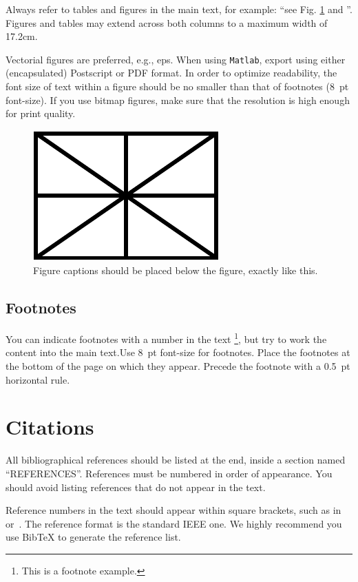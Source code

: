 \documentclass{article}
\begin{document}
Always refer to tables and figures in the main text, for example: ``see Fig. \ref{fig:example} and ''.
Figures and tables may extend across both columns to a maximum width of 17.2cm.

Vectorial figures are preferred, e.g., eps. When using \texttt{Matlab}, export using either (encapsulated) Postscript or PDF format. In order to optimize readability, the font size of text within a figure should be no smaller than
that of footnotes (8~pt font-size). If you use bitmap figures, make sure that the resolution is high enough for print quality. 

\begin{figure}[t]
\centering
\includegraphics[width=0.6\columnwidth]{figure}
\caption{Figure captions should be placed below the figure, 
exactly like this.\label{fig:example}}
\end{figure}


\subsection{Footnotes}
You can indicate footnotes with a number in the text \footnote{This is a footnote example.},
but try to work the content into the main text.Use 8~pt font-size for footnotes.  Place the footnotes at the bottom of the page 
on which they appear. Precede the footnote with a 0.5~pt horizontal rule.

\section{Citations}
All bibliographical references should be listed at the end, inside a section named ``REFERENCES''. References must be numbered in order of appearance. You should avoid listing references that do not appear in the text.

Reference numbers in the text should appear within square brackets, such as in~\cite{Someone:00} or~\cite{Someone:00,Someone:04,Someone:09}. The reference format is the standard IEEE one. We highly recommend you use BibTeX 
to generate the reference list.
\end{document}
